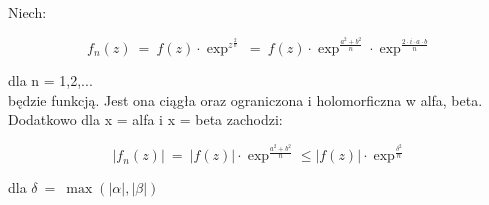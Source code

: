 \documentclass{article}
\begin{document}
Niech:

\begin{equation}
	f_{n}(z)\ =\ f(z)\cdot \exp ^{z^{\frac {2}{n}}}\ =\ f(z)\cdot \exp ^{\frac {a^{2}+b^{2}}{n}}\cdot \exp ^{\frac {2\cdot i\cdot a\cdot b}{n}}
\end{equation}

dla n = 1,2,... \\

będzie funkcją. Jest ona ciągła oraz ograniczona i holomorficzna w alfa, beta. Dodatkowo dla x = alfa i x = beta zachodzi: 

\begin{displaymath}
	|f_{n}(z)|\ =\ |f(z)|\cdot \exp ^{\frac {a^{2}+b^{2}}{n}}\leq |f(z)|\cdot \exp ^{\frac {\delta ^{2}}{n}}
\end{displaymath}

dla \(\delta \ =\ \max(|\alpha |,|\beta |)\)
\end{document}
